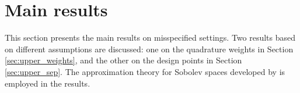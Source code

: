 \documentclass[11pt]{article}
\theoremstyle{remark}
\theoremstyle{example}
\theoremstyle{remark}
\begin{document}
\begin{comment}
\paragraph{Random design points.}

\cite{BriOatGirOsbSej15} also analyze Bayesian quadrature with {\em random} design points. 
They consider the case where $X^n$ is a reversible, uniformly ergodic Markov chain with stationary distribution $P$ (which includes the case of an i.i.d.~sample), and establish the convergence rates for the worst case error in standard Sobolev spaces \cite[Theorem 1]{BriOatGirOsbSej15}.
The proof idea for Proposition \ref{prop:BQ_fill} in this paper is borrowed from this result.
For interested readers, we also refer to \cite{OatCocBriGir16}, which establishes a probabilistic upper-bound on the fill distance of such Markov chain.

Independently, \cite{Bac15} establishes convergence results for Bayesian quadrature with random design points \cite[Proposition 1]{Bac15}.
The rates are derived for the case where the design points are i.i.d.~from a specific proposal distribution, which is in general intractable in practice.
Nevertheless, his result has wide applicability in the sense that it is applicable to general RKHSs.

\end{comment}





\section{Main results} \label{sec:sobolev}

This section presents the main results on misspecified settings.  Two results based on different assumptions are discussed: one on the quadrature weights in Section \ref{sec:upper_weights}, and the other on the design points in Section \ref{sec:upper_sep}.  The approximation theory for Sobolev spaces developed by \cite{NarWar04} is employed in the results. 
\end{document}
